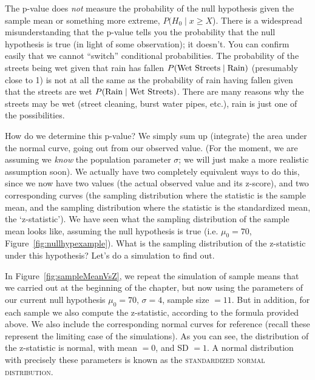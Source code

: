 \documentclass[12pt]{book}\usepackage[]{graphicx}\usepackage[]{color}
\begin{document}
The p-value does \textit{not} measure the
probability of the null hypothesis given the sample mean or something more extreme, $P(H_0 \mid
x\geq X$).  There is a widespread misunderstanding that the
p-value tells you the probability that the null hypothesis is true (in
light of some observation); it doesn't. You can confirm easily that we
cannot ``switch'' conditional probabilities. The probability of the
streets being wet given that rain has fallen $P(\hbox{Wet Streets} \mid
\hbox{Rain})$ (presumably close to 1) is not at all the same as the
probability of rain having fallen given that the streets are wet
$P(\hbox{Rain}\mid \hbox{Wet Streets})$. There are many reasons why the streets may
be wet (street cleaning, burst water pipes, etc.), rain is just one of
the possibilities.


How do we determine this p-value? We simply sum up
(integrate) the area under the normal curve, going out from our observed
value. (For the moment, we are assuming we \emph{know}
the population parameter $\sigma$; we will just make a more realistic assumption soon). We actually have two completely equivalent ways
to do this, since we now have two values (the actual observed value
and its z-score), and two corresponding curves (the  sampling
distribution where the statistic is the sample mean, and the sampling
distribution where the statistic is the standardized mean, the
`z-statistic'). We have seen what the sampling distribution of the sample mean looks like, assuming the null hypothesis is true (i.e. $\mu_0 = 70$, Figure~\ref{fig:nullhypexample}). What is the sampling distribution of the z-statistic under this hypothesis? Let's do a simulation to find out.

In Figure~\ref{fig:sampleMeanVsZ}, we repeat the simulation of sample
means that we carried out at the beginning of the chapter, but now using the parameters of our current null hypothesis $\mu_0 = 70$, $\sigma = 4$, sample size $=11$. But in addition, for each sample we also compute the z-statistic, according to the formula provided above. We also include the corresponding normal curves for reference (recall these represent the limiting case of the simulations). As you can see, the distribution of the z-statistic is normal, with mean $=0$, and SD $=1$. A normal distribution with precisely these parameters is known as the \textsc{standardized normal distribution}.
\end{document}

